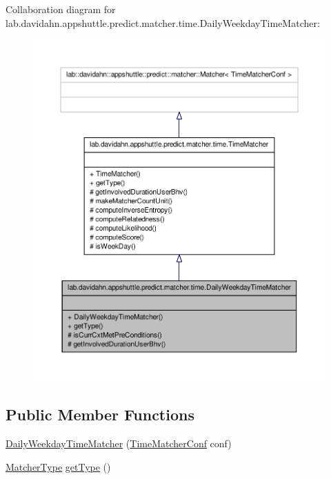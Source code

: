 \-Collaboration diagram for lab.\-davidahn.\-appshuttle.\-predict.\-matcher.\-time.\-Daily\-Weekday\-Time\-Matcher\-:
\nopagebreak
\begin{figure}[H]
\begin{center}
\leavevmode
\includegraphics[width=350pt]{classlab_1_1davidahn_1_1appshuttle_1_1predict_1_1matcher_1_1time_1_1_daily_weekday_time_matcher__coll__graph}
\end{center}
\end{figure}
\subsection*{\-Public \-Member \-Functions}
\begin{DoxyCompactItemize}
\item 
\hyperlink{classlab_1_1davidahn_1_1appshuttle_1_1predict_1_1matcher_1_1time_1_1_daily_weekday_time_matcher_a9c7d2bf52e158bcb4d2fa12a53a504ff}{\-Daily\-Weekday\-Time\-Matcher} (\hyperlink{classlab_1_1davidahn_1_1appshuttle_1_1predict_1_1matcher_1_1time_1_1_time_matcher_conf}{\-Time\-Matcher\-Conf} conf)
\item 
\hyperlink{enumlab_1_1davidahn_1_1appshuttle_1_1predict_1_1matcher_1_1_matcher_type}{\-Matcher\-Type} \hyperlink{classlab_1_1davidahn_1_1appshuttle_1_1predict_1_1matcher_1_1time_1_1_daily_weekday_time_matcher_af839a6247a9d1593c3d91b8c802806bb}{get\-Type} ()
\end{DoxyCompactItemize}

